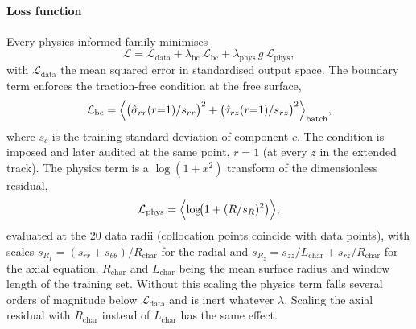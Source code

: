 \paragraph{Loss function}
Every physics-informed family minimises
\begin{equation}
  \mathcal{L} = \mathcal{L}_{\mathrm{data}}
              + \lambda_{\mathrm{bc}}\,\mathcal{L}_{\mathrm{bc}}
              + \lambda_{\mathrm{phys}}\,g\,\mathcal{L}_{\mathrm{phys}},
  \label{eq:loss}
\end{equation}
with $\mathcal{L}_{\mathrm{data}}$ the mean squared error in standardised output
space. The boundary term enforces the traction-free condition at the free
surface,
\begin{equation}
  \mathcal{L}_{\mathrm{bc}} = \Bigl\langle
     \bigl(\hat\sigma_{rr}(r{=}1)/s_{rr}\bigr)^2
   + \bigl(\hat\tau_{rz}(r{=}1)/s_{rz}\bigr)^2 \Bigr\rangle_{\mathrm{batch}},
  \label{eq:lbc}
\end{equation}
where $s_c$ is the training standard deviation of component $c$. The condition is
imposed and later audited at the same point, $r=1$ (at every $z$ in the extended
track). The physics term is a $\log(1+x^2)$ transform of the dimensionless
residual,
\begin{equation}
  \mathcal{L}_{\mathrm{phys}} = \Bigl\langle \log\!\bigl(1 + (R/s_R)^2\bigr) \Bigr\rangle,
  \label{eq:lphys}
\end{equation}
evaluated at the 20 data radii (collocation points coincide with data points),
with scales $s_{R_1}=(s_{rr}+s_{\theta\theta})/R_{\mathrm{char}}$ for the radial and
$s_{R_z}=s_{zz}/L_{\mathrm{char}}+s_{rz}/R_{\mathrm{char}}$ for the axial equation,
$R_{\mathrm{char}}$ and $L_{\mathrm{char}}$ being the mean surface radius and window
length of the training set.
Without this scaling the physics term falls several orders of magnitude below
$\mathcal{L}_{\mathrm{data}}$ and is inert whatever $\lambda$. Scaling the axial
residual with $R_{\mathrm{char}}$ instead of $L_{\mathrm{char}}$ has the same effect.

